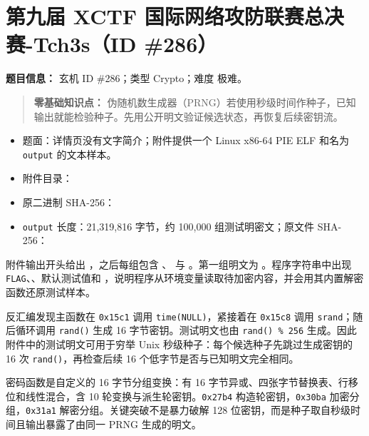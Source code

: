 \section{第九届 XCTF 国际网络攻防联赛总决赛-Tch3s（ID \#286）}\label{ux7b2cux4e5dux5c4a-xctf-ux56fdux9645ux7f51ux7edcux653bux9632ux8054ux8d5bux603bux51b3ux8d5b-tch3sid-286}

\textbf{题目信息：} 玄机 ID \#286；类型 Crypto；难度 极难。

\begin{quote}
\textbf{零基础知识点：} 伪随机数生成器（PRNG）若使用秒级时间作种子，已知输出就能检验种子。先用公开明文验证候选状态，再恢复后续密钥流。
\end{quote}

\begin{itemize}
\tightlist
\item
  题面：详情页没有文字简介；附件提供一个 Linux x86-64 PIE ELF 和名为 \texttt{output} 的文本样本。
\item
  附件目录：\texttt{}
\item
  原二进制 SHA-256：\texttt{}
\item
  \texttt{output} 长度：21,319,816 字节，约 100,000 组测试明密文；原文件 SHA-256：\texttt{}
\end{itemize}

附件输出开头给出 \texttt{}，之后每组包含 \texttt{}、\texttt{} 与 \texttt{}。第一组明文为 \texttt{}。程序字符串中出现 \texttt{FLAG}、\texttt{}、默认测试值和 \texttt{}，说明程序从环境变量读取待加密内容，并会用其内置解密函数还原测试样本。

反汇编发现主函数在 \texttt{0x15c1} 调用 \texttt{time(NULL)}，紧接着在 \texttt{0x15c8} 调用 \texttt{srand}；随后循环调用 \texttt{rand()} 生成 16 字节密钥。测试明文也由 \texttt{rand()\ \%\ 256} 生成。因此附件中的测试明文可用于穷举 Unix 秒级种子：每个候选种子先跳过生成密钥的 16 次 \texttt{rand()}，再检查后续 16 个低字节是否与已知明文完全相同。

密码函数是自定义的 16 字节分组变换：有 16 字节异或、四张字节替换表、行移位和线性混合，含 10 轮变换与派生轮密钥。\texttt{0x27b4} 构造轮密钥，\texttt{0x30ba} 加密分组，\texttt{0x31a1} 解密分组。关键突破不是暴力破解 128 位密钥，而是种子取自秒级时间且输出暴露了由同一 PRNG 生成的明文。

